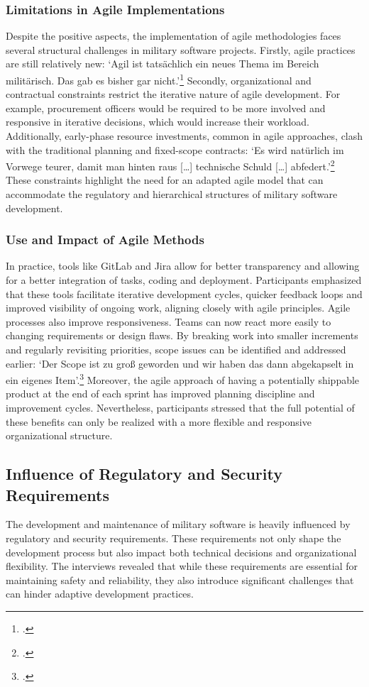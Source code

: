\subsubsection{Limitations in Agile Implementations}
Despite the positive aspects, the implementation of agile methodologies faces several structural challenges in military software projects. Firstly, agile practices are still relatively new: `Agil ist tatsächlich ein neues Thema im Bereich militärisch. Das gab es bisher gar nicht.'\footcite{Interview12025}
Secondly, organizational and contractual constraints restrict the iterative nature of agile development. For example, procurement officers would be required to be more involved and responsive in iterative decisions, which would increase their workload. Additionally, early-phase resource investments, common in agile approaches,
clash with the traditional planning and fixed-scope contracts: `Es wird natürlich im Vorwege teurer, damit man hinten raus [\ldots] technische Schuld [\ldots] abfedert.'\footcite{Interview12025} These constraints highlight the need for an adapted agile model that can accommodate the regulatory and hierarchical structures of military software development.\\

\subsubsection{Use and Impact of Agile Methods}
In practice, tools like GitLab and Jira allow for better transparency and allowing for a better integration of tasks, coding and deployment. Participants emphasized that these tools facilitate iterative development cycles, quicker feedback loops and 
improved visibility of ongoing work, aligning closely with agile principles. 
Agile processes also improve responsiveness. Teams can now react more easily to changing requirements or design flaws. By breaking work into smaller increments and regularly revisiting priorities, scope issues can be identified and addressed earlier:
`Der Scope ist zu groß geworden und wir haben das dann abgekapselt in ein eigenes Item'.\footcite{Interview32025} Moreover, the agile approach of having a potentially shippable product at the end of each sprint has improved planning discipline and improvement cycles.
Nevertheless, participants stressed that the full potential of these benefits can only be realized with a more flexible and responsive organizational structure.\\

\subsection{Influence of Regulatory and Security Requirements}
The development and maintenance of military software is heavily influenced by regulatory and security requirements. These requirements not only shape the development process but also impact both technical decisions and organizational flexibility.
The interviews revealed that while these requirements are essential for maintaining safety and reliability, they also introduce significant challenges that can hinder adaptive development practices.

